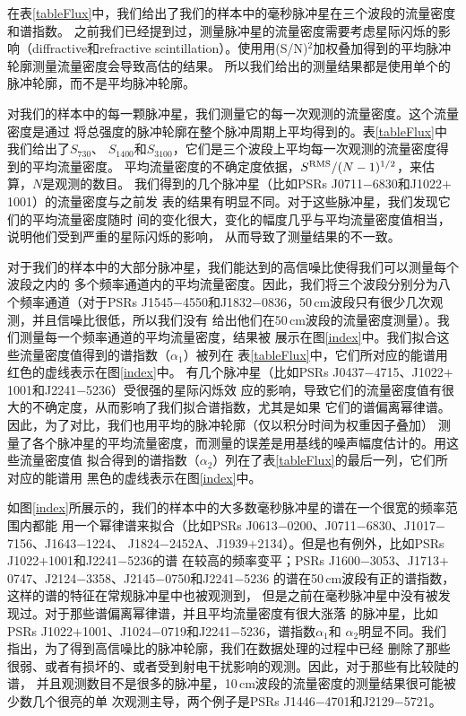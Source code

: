 在表\ref{tableFlux}中，我们给出了我们的样本中的毫秒脉冲星在三个波段的流量密度和谱指数。
之前我们已经提到过，测量脉冲星的流量密度需要考虑星际闪烁的影响（diffractive和refractive 
scintillation）。使用用(S/N)$^2$加权叠加得到的平均脉冲轮廓测量流量密度会导致高估的结果。
所以我们给出的测量结果都是使用单个的脉冲轮廓，而不是平均脉冲轮廓。

对我们的样本中的每一颗脉冲星，我们测量它的每一次观测的流量密度。这个流量密度是通过
将总强度的脉冲轮廓在整个脉冲周期上平均得到的。表\ref{tableFlux}中我们给出了$S_{730}$、
$S_{1400}$和$S_{3100}$，它们是三个波段上平均每一次观测的流量密度得到的平均流量密度。
平均流量密度的不确定度依据，$S^{\rm{RMS}}/(N-1)^{1/2}$，来估算，$N$是观测的数目。
%
我们得到的几个脉冲星（比如PSRs J0711$-$6830和J1022$+$1001）的流量密度与之前发
表的结果\supercite{Yan11a}有明显不同。对于这些脉冲星，我们发现它们的平均流量密度随时
间的变化很大，变化的幅度几乎与平均流量密度值相当，说明他们受到严重的星际闪烁的影响，
从而导致了测量结果的不一致。

对于我们的样本中的大部分脉冲星，我们能达到的高信噪比使得我们可以测量每个波段之内的
多个频率通道内的平均流量密度。因此，我们将三个波段分别分为八个频率通道（对于PSRs 
J1545$-$4550和J1832$-$0836，50\,cm波段只有很少几次观测，并且信噪比很低，所以我们没有
给出他们在50\,cm波段的流量密度测量）。我们测量每一个频率通道的平均流量密度，结果被
展示在图\ref{index}中。我们拟合这些流量密度值得到的谱指数（$\alpha_1$）被列在
表\ref{tableFlux}中，它们所对应的能谱用红色的虚线表示在图\ref{index}中。
%
有几个脉冲星（比如PSRs J0437$-$4715、J1022$+$1001和J2241$-$5236）受很强的星际闪烁效
应的影响，导致它们的流量密度值有很大的不确定度，从而影响了我们拟合谱指数，尤其是如果
它们的谱偏离幂律谱。因此，为了对比，我们也用平均的脉冲轮廓（仅以积分时间为权重因子叠加）
测量了各个脉冲星的平均流量密度，而测量的误差是用基线的噪声幅度估计的。用这些流量密度值
拟合得到的谱指数（$\alpha_2$）列在了表\ref{tableFlux}的最后一列，它们所对应的能谱用
黑色的虚线表示在图\ref{index}中。

如图\ref{index}所展示的，我们的样本中的大多数毫秒脉冲星的谱在一个很宽的频率范围内都能
用一个幂律谱来拟合（比如PSRs J0613$-$0200、J0711$-$6830、J1017$-$7156、J1643$-$1224、
J1824$-$2452A、J1939$+$2134）。但是也有例外，比如PSRs J1022$+$1001和J2241$-$5236的谱
在较高的频率变平；PSRs J1600$-$3053、J1713$+$0747、J2124$-$3358、J2145$-$0750和J2241$-$5236
的谱在50\,cm波段有正的谱指数，这样的谱的特征在常规脉冲星中也被观测到\supercite{Kijak11}，
但是之前在毫秒脉冲星中没有被发现过。对于那些谱偏离幂律谱，并且平均流量密度有很大涨落
的脉冲星，比如PSRs J1022$+$1001、J1024$-$0719和J2241$-$5236，谱指数$\alpha_1$和
$\alpha_2$明显不同。我们指出，为了得到高信噪比的脉冲轮廓，我们在数据处理的过程中已经
删除了那些很弱、或者有损坏的、或者受到射电干扰影响的观测。因此，对于那些有比较陡的谱，
并且观测数目不是很多的脉冲星，10\,cm波段的流量密度的测量结果很可能被少数几个很亮的单
次观测主导，两个例子是PSRs J1446$-$4701和J2129$-$5721。

